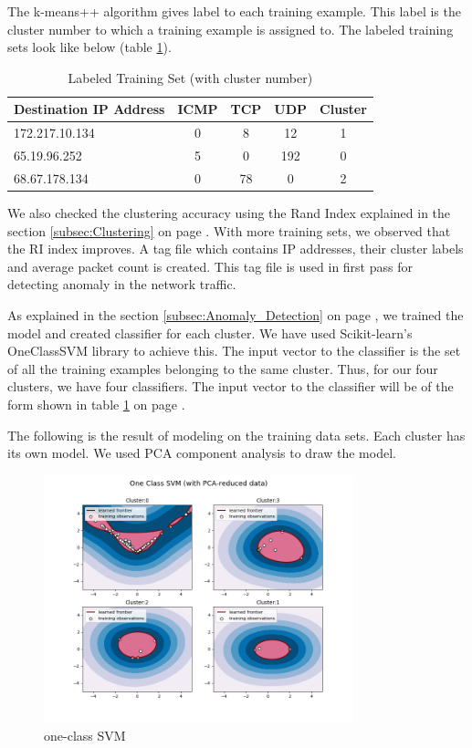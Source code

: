 \documentclass[12pt,oneside,a4paper]{article}
\begin{document}
The k-means++ algorithm gives label to each training example. This label is the cluster number to which a training example is assigned to. The labeled training sets look like below (table \ref{table:labeled-set}).

\begin{table}[H]
\centering
  \begin{tabular}{| l | c | c | c | c |}
    \hline
    {Destination IP Address}  &ICMP  &TCP &UDP  &Cluster \\
    \hline
    172.217.10.134  & 0     & 8     & 12  &1  \\ \hline
    65.19.96.252    & 5     & 0     & 192 &0  \\ \hline
    68.67.178.134   & 0     & 78    & 0   &2  \\ \hline
  \end{tabular}
\caption{Labeled Training Set (with cluster number)} \label{table:labeled-set}
\end{table}

We also checked the clustering accuracy using the Rand Index explained in the section \ref{subsec:Clustering} on page \pageref{subsec:Clustering}. With more training sets, we observed that the RI index improves. A tag file which contains IP addresses, their cluster labels and average packet count is created. This tag file is used in first pass for detecting anomaly in the network traffic.

As explained in the section \ref{subsec:Anomaly_Detection} on page \pageref{subsec:Anomaly_Detection}, we trained the model and created classifier for each cluster. We have used Scikit-learn's OneClassSVM library to achieve this. The input vector to the classifier is the set of all the training examples belonging to the same cluster. Thus, for our four clusters, we have four classifiers. The input vector to the classifier will be of the form shown in table \ref{table:labeled-set} on page \pageref{table:labeled-set}.

The following is the result of modeling on the training data sets. Each cluster has its own model. We used PCA component analysis to draw the model.

\begin{figure}[H]
\centering
\includegraphics[width=0.80\textwidth]{one-class-SVM.png}
\caption{one-class SVM} \label{fig:one-class-SVM}
\end{figure}
\end{document}
